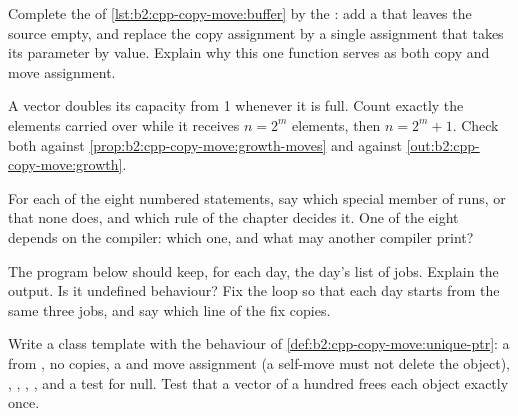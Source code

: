 \begin{exercise}[$\star$]\label{exo:b2:cpp-copy-move:3}
Complete the  of \cref{lst:b2:cpp-copy-move:buffer} by the : add a   that leaves the source empty, and replace the copy assignment by a single assignment
 that takes its parameter by value. Explain why this one function serves as both copy and
move assignment.
\end{exercise}

\begin{exercise}[$\star$]\label{exo:b2:cpp-copy-move:4}
A vector doubles its capacity from 1 whenever it is full. Count exactly the elements carried over while it
receives $n = 2^m$ elements, then $n = 2^m + 1$. Check both against \cref{prop:b2:cpp-copy-move:growth-moves} and
against \cref{out:b2:cpp-copy-move:growth}.
\end{exercise}

\begin{exercise}[$\star\star$]\label{exo:b2:cpp-copy-move:5}
For each of the eight numbered statements, say which special member of  runs, or that none does, and
which rule of the chapter decides it. One of the eight depends on the compiler: which one, and what may another
compiler print?
\end{exercise}

\begin{exercise}[$\star\star$]\label{exo:b2:cpp-copy-move:6}
The program below should keep, for each day, the day's list of jobs. Explain the output. Is it undefined behaviour?
Fix the loop so that each day starts from the same three jobs, and say which line of the fix copies.
\end{exercise}

\begin{exercise}[$\star\star$]\label{exo:b2:cpp-copy-move:7}
Write a class template  with the behaviour of \cref{def:b2:cpp-copy-move:unique-ptr}: a
 from , no copies, a   and move assignment (a self-move must not
delete the object), \code{*}, \code{->}, , ,  and a test for null. Test that a
vector of a hundred  frees each object exactly once.
\end{exercise}

